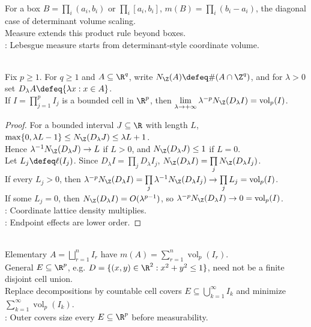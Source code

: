 \begin{perspective} \label{per:box-volume-and-linear-algebra} \\
For a box $B=\prod_i(a_i,b_i)$ or $\prod_i[a_i,b_i]$, $m(B)=\prod_i(b_i-a_i)$, the diagonal case of determinant volume scaling.\\
Measure extends this product rule beyond boxes.\\
: Lebesgue measure starts from determinant-style coordinate volume.
\end{perspective}

\begin{proposition} \label{prop:lattice-counts-recover-cell-volume} \\
Fix $p\geq1$. For $q\geq1$ and $A\subseteq\R^q$, write $N_{\Z}(A)\defeq\#(A\cap\Z^q)$, and for $\lambda>0$ set $D_\lambda A\defeq\{\lambda x:x\in A\}$.\\
If $I=\prod_{j=1}^{p}I_j$ is a bounded cell in $\R^p$, then $\lim\limits_{\lambda\to+\infty}\lambda^{-p}N_{\Z}(D_\lambda I)=\operatorname{vol}_p(I)$.
\begin{proof}
For a bounded interval $J\subseteq\R$ with length $L$, $\max\{0,\lambda L-1\}\leq N_{\Z}(D_\lambda J)\leq\lambda L+1$.\\
Hence $\lambda^{-1}N_{\Z}(D_\lambda J)\to L$ if $L>0$, and $N_{\Z}(D_\lambda J)\leq1$ if $L=0$.\\
Let $L_j\defeq\ell(I_j)$. Since $D_\lambda I=\prod\limits_jD_\lambda I_j$, $N_{\Z}(D_\lambda I)=\prod\limits_jN_{\Z}(D_\lambda I_j)$.\\
If every $L_j>0$, then $\lambda^{-p}N_{\Z}(D_\lambda I)=\prod\limits_j\lambda^{-1}N_{\Z}(D_\lambda I_j)\to\prod\limits_jL_j=\operatorname{vol}_p(I)$.\\
If some $L_j=0$, then $N_{\Z}(D_\lambda I)=O(\lambda^{p-1})$, so $\lambda^{-p}N_{\Z}(D_\lambda I)\to0=\operatorname{vol}_p(I)$.\\
: Coordinate lattice density multiplies.\\
: Endpoint effects are lower order.
\end{proof}
\end{proposition}

\begin{perspective} \label{per:outer-measure-overestimation} \\
Elementary $A=\bigsqcup_{r=1}^{n}I_r$ have $m(A)=\sum_{r=1}^{n}\operatorname{vol}_p(I_r)$.\\
General $E\subseteq\R^p$, e.g. $D=\{(x,y)\in\R^2:x^2+y^2\leq1\}$, need not be a finite disjoint cell union.\\
Replace decompositions by countable cell covers $E\subseteq\bigcup_{k=1}^{\infty}I_k$ and minimize $\sum_{k=1}^{\infty}\operatorname{vol}_p(I_k)$.\\
: Outer covers size every $E\subseteq\R^p$ before measurability.
\end{perspective}

